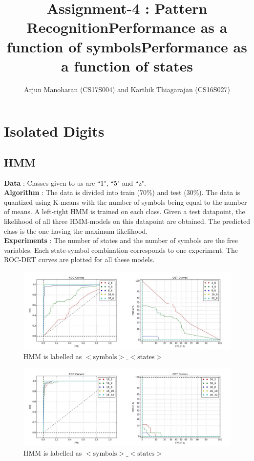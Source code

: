 \documentclass{article}
\title{Assignment-4 : Pattern Recognition}
\author{Arjun Manoharan (CS17S004) and Karthik Thiagarajan (CS16S027)}
\begin{document}
\maketitle

\tableofcontents

\newpage
\section{Isolated Digits}
\subsection{HMM}
\textbf{Data} : Classes given to us are ``1", ``5" and ``z".\\
\textbf{Algorithm} : The data is divided into train (70\%) and test (30\%). The data is quantized using K-means with the number of symbols being equal to the number of means. A left-right HMM is trained on each class. Given a test datapoint, the likelihood of all three HMM-models on this datapoint are obtained. The predicted class is the one having the maximum likelihood.\\
\textbf{Experiments} : The number of states and the number of symbols are the free variables. Each state-symbol combination corresponds to one experiment. The ROC-DET curves are plotted for all these models.

\begin{figure}[h!]
\centering
\title{Performance as a function of symbols}
\includegraphics[width=\textwidth]{isolated_digits/plots/hmm/roc_det_symbols.jpg}
\caption{HMM is labelled as $<\text{symbols}>\_<\text{states}>$}
\end{figure}

\begin{figure}[h!]
\centering
\title{Performance as a function of states}
\includegraphics[width=\textwidth]{isolated_digits/plots/hmm/roc_det_states.jpg}
\caption{HMM is labelled as $<\text{symbols}>\_<\text{states}>$}
\end{figure}
\end{document}
